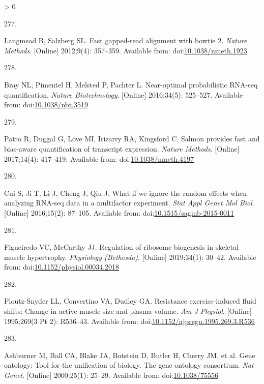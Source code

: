 \documentclass[twoside,10pt]{gihclass} %
\newlength{\cslhangindent}
\newlength{\csllabelwidth}
\newenvironment{CSLReferences}[3] %
 {%
  \setlength{\parindent}{0pt}
  \ifodd #1 \everypar{\setlength{\hangindent}{\cslhangindent}}\ignorespaces\fi
  \ifnum #2 > 0
  \setlength{\parskip}{#2\baselineskip}
  \fi
 }%
 {}
\newcommand{\CSLLeftMargin}[1]{\parbox[t]{\maxof{\widthof{#1}}{\csllabelwidth}}{#1}}
\newcommand{\CSLRightInline}[1]{\parbox[t]{\linewidth}{#1}}
\begin{document}
\begin{CSLReferences}{0}{0}
\leavevmode\hypertarget{ref-RN2388}{}%
\CSLLeftMargin{277. }
\CSLRightInline{Langmead B, Salzberg SL. Fast gapped-read alignment with bowtie 2. \emph{Nature Methods}. {[}Online{]} 2012;9(4): 357--359. Available from: doi:\href{https://doi.org/10.1038/nmeth.1923}{10.1038/nmeth.1923}}

\leavevmode\hypertarget{ref-RN2389}{}%
\CSLLeftMargin{278. }
\CSLRightInline{Bray NL, Pimentel H, Melsted P, Pachter L. Near-optimal probabilistic RNA-seq quantification. \emph{Nature Biotechnology}. {[}Online{]} 2016;34(5): 525--527. Available from: doi:\href{https://doi.org/10.1038/nbt.3519}{10.1038/nbt.3519}}

\leavevmode\hypertarget{ref-RN2390}{}%
\CSLLeftMargin{279. }
\CSLRightInline{Patro R, Duggal G, Love MI, Irizarry RA, Kingsford C. Salmon provides fast and bias-aware quantification of transcript expression. \emph{Nature Methods}. {[}Online{]} 2017;14(4): 417--419. Available from: doi:\href{https://doi.org/10.1038/nmeth.4197}{10.1038/nmeth.4197}}

\leavevmode\hypertarget{ref-RN2366}{}%
\CSLLeftMargin{280. }
\CSLRightInline{Cui S, Ji T, Li J, Cheng J, Qiu J. What if we ignore the random effects when analyzing RNA-seq data in a multifactor experiment. \emph{Stat Appl Genet Mol Biol}. {[}Online{]} 2016;15(2): 87--105. Available from: doi:\href{https://doi.org/10.1515/sagmb-2015-0011}{10.1515/sagmb-2015-0011}}

\leavevmode\hypertarget{ref-RN2142}{}%
\CSLLeftMargin{281. }
\CSLRightInline{Figueiredo VC, McCarthy JJ. Regulation of ribosome biogenesis in skeletal muscle hypertrophy. \emph{Physiology (Bethesda)}. {[}Online{]} 2019;34(1): 30--42. Available from: doi:\href{https://doi.org/10.1152/physiol.00034.2018}{10.1152/physiol.00034.2018}}

\leavevmode\hypertarget{ref-RN2270}{}%
\CSLLeftMargin{282. }
\CSLRightInline{Ploutz-Snyder LL, Convertino VA, Dudley GA. Resistance exercise-induced fluid shifts: Change in active muscle size and plasma volume. \emph{Am J Physiol}. {[}Online{]} 1995;269(3 Pt 2): R536--43. Available from: doi:\href{https://doi.org/10.1152/ajpregu.1995.269.3.R536}{10.1152/ajpregu.1995.269.3.R536}}

\leavevmode\hypertarget{ref-RN2889}{}%
\CSLLeftMargin{283. }
\CSLRightInline{Ashburner M, Ball CA, Blake JA, Botstein D, Butler H, Cherry JM, et al. Gene ontology: Tool for the unification of biology. The gene ontology consortium. \emph{Nat Genet}. {[}Online{]} 2000;25(1): 25--29. Available from: doi:\href{https://doi.org/10.1038/75556}{10.1038/75556}}


\end{CSLReferences}
\end{document}
